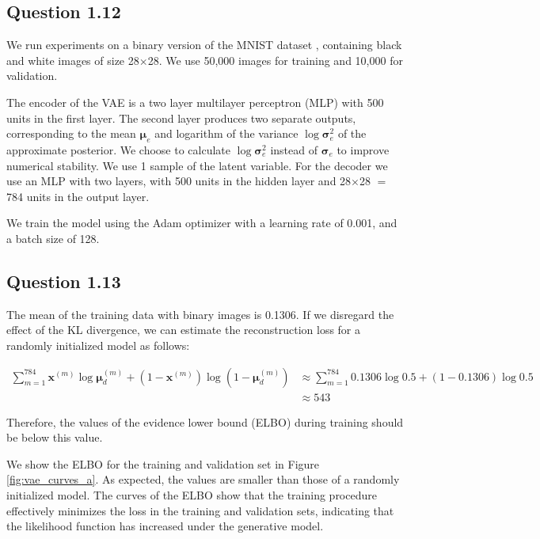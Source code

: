 \documentclass{article}
\begin{document}
\subsection*{Question 1.12}

We run experiments on a binary version of the MNIST dataset \cite{lecun1998gradient}, containing black and white images of size 28$\times$28. We use 50,000 images for training and 10,000 for validation.

The encoder of the VAE is a two layer multilayer perceptron (MLP) with 500 units in the first layer. The second layer produces two separate outputs, corresponding to the mean $\boldsymbol{\mu}_e$ and logarithm of the variance $\log\boldsymbol{\sigma}_e^2$ of the approximate posterior. We choose to calculate $\log\boldsymbol{\sigma}_e^2$ instead of $\boldsymbol{\sigma}_e$ to improve numerical stability. We use 1 sample of the latent variable. For the decoder we use an MLP with two layers, with 500 units in the hidden layer and 28$\times$28 $=$ 784 units in the output layer.

We train the model using the Adam optimizer \cite{kingma2014adam} with a learning rate of 0.001, and a batch size of 128.

\subsection*{Question 1.13}

The mean of the training data with binary images is 0.1306. If we disregard the effect of the KL divergence, we can estimate the reconstruction loss for a randomly initialized model as follows:

\begin{align*}
\sum_{m=1}^{784} \mathbf{x}^{(m)}\log\boldsymbol{\mu}_d^{(m)} + (1-\mathbf{x}^{(m)})\log(1 -\boldsymbol{\mu}_d^{(m)})
&\approx
\sum_{m=1}^{784} 0.1306\log 0.5 + (1-0.1306)\log 0.5 \\
&\approx 543
\end{align*}

Therefore, the values of the evidence lower bound (ELBO) during training should be below this value.

We show the ELBO for the training and validation set in Figure \ref{fig:vae_curves_a}. As expected, the values are smaller than those of a randomly initialized model. The curves of the ELBO show that the training procedure effectively minimizes the loss in the training and validation sets, indicating that the likelihood function has increased under the generative model.
\end{document}
